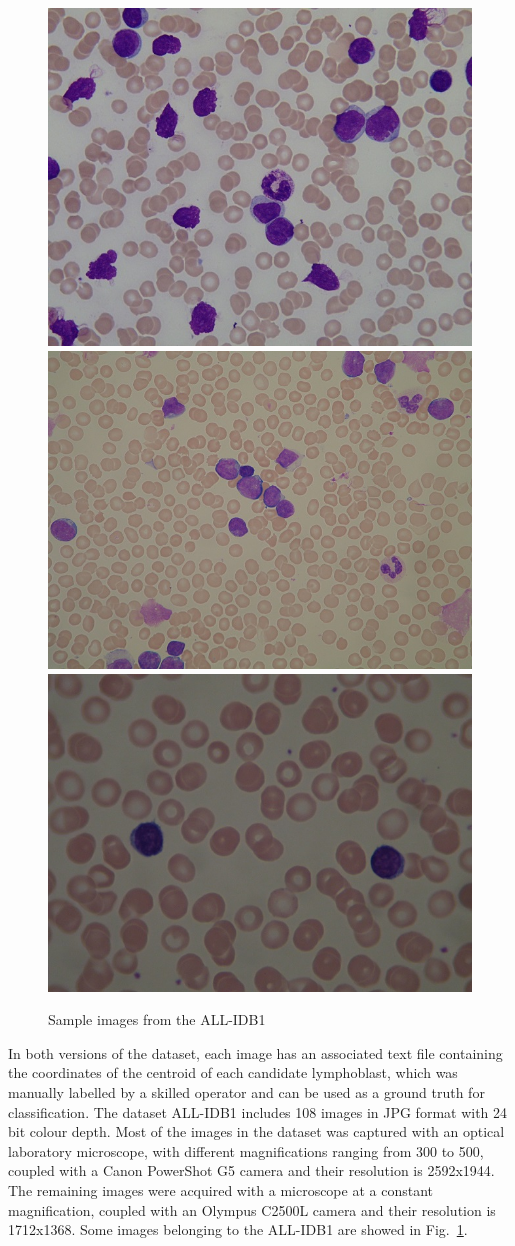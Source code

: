 \documentclass[final,a4paper,12pt,english]{UnicaPhdThesis3}
\begin{document}
\begin{figure}[!htbp]
\centering
\includegraphics[height=0.25\textwidth]{images/Fig17-1}
\includegraphics[height=0.25\textwidth]{images/Fig17-2}
\includegraphics[height=0.25\textwidth]{images/Fig17-3}
\caption{\label{fig:dataset}Sample images from the ALL-IDB1}
\end{figure}

In both versions of the dataset, each image has an associated text file containing  the coordinates of the centroid of each candidate  lymphoblast, which was manually labelled by a skilled operator and can be used as a ground  truth for classification. The dataset ALL-IDB1 includes 108 images in JPG format with 24 bit colour depth. Most of the images in the dataset was captured with an optical laboratory microscope, with different magnifications ranging from 300 to 500, coupled with a Canon PowerShot G5 camera and their resolution is 2592x1944. The remaining images were acquired with a microscope at a constant magnification, coupled with an Olympus C2500L camera and their resolution is 1712x1368. Some images belonging to the ALL-IDB1 are showed in Fig.~\ref{fig:dataset}.
\end{document}
